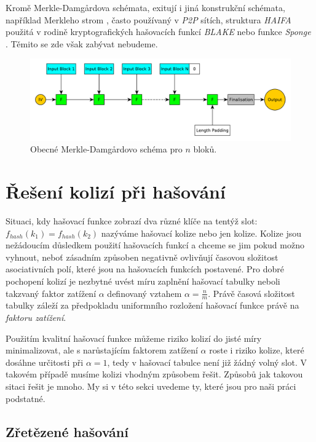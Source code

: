 Kromě Merkle-Damg\r{a}rdova schémata, exitují i jiná konstrukční schémata, například Merkleho strom 
\cite{merkle1}, často používaný v \textit{P2P} sítích,
struktura \textit{HAIFA} \cite{haifa} použitá v rodině kryptografických hašovacích funkcí \textit{BLAKE}
nebo funkce \textit{Sponge} \cite{sponge}. Těmito se zde však zabývat nebudeme.

 
\begin{figure}
	\centering
	\includegraphics[width=\textwidth]{fig/merkle_damgard}
	\caption{Obecné Merkle-Damg\r{a}rdovo schéma pro $n$ bloků.}
	\label{fig:merkle_damgard}
\end{figure}

\section{Řešení kolizí při hašování}
\label{sec:collisions}

Situaci, kdy hašovací funkce zobrazí dva různé klíče na tentýž slot:
$f_{hash} (k_{1}) = f_{hash} (k_{2})$ nazýváme hašovací kolize nebo jen kolize. 
Kolize jsou nežádoucím důsledkem použití hašovacích funkcí
a chceme se jim pokud možno vyhnout, neboť zásadním způsoben negativně ovlivňují 
časovou složitost asociativních polí, které jsou na hašovacích funkcích postavené. 
Pro dobré pochopení kolizí je nezbytné uvést míru zaplnění hašovací tabulky
neboli takzvaný faktor zatížení $\alpha$ definovaný vztahem $\alpha = \frac{n}{m}$.
Právě časová složitost tabulky záleží za předpokladu uniformního rozložení 
hašovací funkce právě na \textit{faktoru zatížení}. 

Použitím kvalitní hašovací funkce můžeme riziko kolizí do jisté míry minimalizovat, ale
s narůstajícím faktorem zatížení $\alpha$ roste i riziko kolize, které dosáhne 
určitosti při $\alpha = 1$, tedy v hašovací tabulce není již žádný volný slot.
V takovém případě musíme kolizi vhodným způsobem řešit. Způsobů jak takovou sitaci
řešit je mnoho. My si v této sekci uvedeme ty, které jsou pro naši práci podstatné.

\subsection{Zřetězené hašování}

